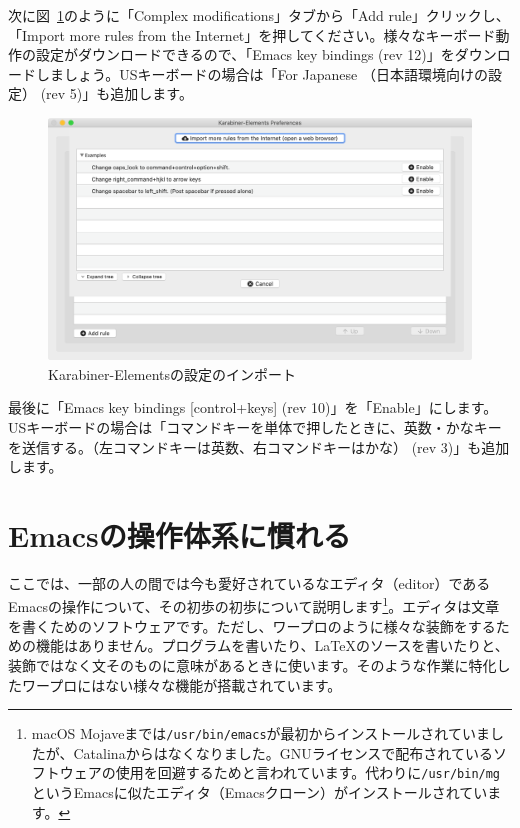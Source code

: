 次に図~\ref{fig:Karabiner_import}のように「Complex modifications」タブから「Add rule」クリックし、「Import more rules from the Internet」を押してください。様々なキーボード動作の設定がダウンロードできるので、「Emacs key bindings (rev 12)」をダウンロードしましょう。USキーボードの場合は「For Japanese （日本語環境向けの設定） (rev 5)」も追加します。

\begin{figure}
  \centering
  \includegraphics[scale=0.35]{fig/Karabiner_import.png}
  \caption{Karabiner-Elementsの設定のインポート}
  \label{fig:Karabiner_import}
\end{figure}

最後に「Emacs key bindings [control+keys] (rev 10)」を「Enable」にします。USキーボードの場合は「コマンドキーを単体で押したときに、英数・かなキーを送信する。（左コマンドキーは英数、右コマンドキーはかな） (rev 3)」も追加します。

\section{Emacsの操作体系に慣れる}
\label{sec:Emacs}

ここでは、一部の人の間では今も愛好されているなエディタ（editor）であるEmacsの操作について、その初歩の初歩について説明します\footnote{macOS Mojaveまでは\texttt{/usr/bin/emacs}が最初からインストールされていましたが、Catalinaからはなくなりました。GNUライセンスで配布されているソフトウェアの使用を回避するためと言われています。代わりに\texttt{/usr/bin/mg}というEmacsに似たエディタ（Emacsクローン）がインストールされています。}。エディタは文章を書くためのソフトウェアです。ただし、ワープロのように様々な装飾をするための機能はありません。プログラムを書いたり、\LaTeX{}のソースを書いたりと、装飾ではなく文そのものに意味があるときに使います。そのような作業に特化したワープロにはない様々な機能が搭載されています。

